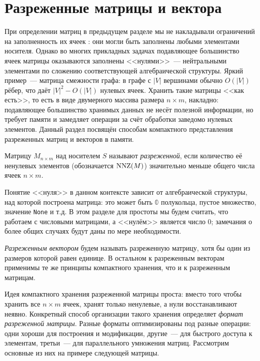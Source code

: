 \section{Разреженные матрицы и вектора}
\label{sec:SparseMatricesAndVectors}

При определении матриц в предыдущем разделе мы не накладывали ограничений на заполненность их ячеек
: они могли быть заполнены любыми элементами носителя.
Однако во многих прикладных задачах подавляющее большинство ячеек матрицы оказываются заполнены <<нулями>>~--- нейтральными элементами по сложению соответствующей алгебраической структуры.
Яркий пример~--- матрица смежности графа: в графе с $|V|$ вершинами обычно $O(|V|)$ рёбер, что даёт $|V|^2 - O(|V|)$ нулевых ячеек.
Хранить такие матрицы <<как есть>>, то есть в виде двумерного массива размера $n \times m$, накладно: подавляющее большинство хранимых данных не несёт полезной информации, но требует памяти и замедляет операции за счёт обработки заведомо нулевых элементов.
Данный раздел посвящён способам компактного представления разреженных матриц и векторов в памяти.

\begin{definition}
    \label{def:SparseMatrix}
    Матрицу $M_{n \times m}$ над носителем $S$ называют \emph{разреженной}, если количество её ненулевых элементов (обозначается $\operatorname{NNZ}(M)$) значительно меньше общего числа ячеек $n \times m$.
\end{definition}

Понятие <<нуля>> в данном контексте зависит от алгебраической структуры, над которой построена матрица: это может быть $\Bbbzero$ полукольца, пустое множество, значение \texttt{None} и т.д.
В этом разделе для простоты мы будем считать, что работаем с числовыми матрицами, а <<нулём>> является число $0$; замечания о более общих случаях будут даны по мере необходимости.

\begin{definition}
    \label{def:SparseVector}
    \emph{Разреженным вектором} будем называть разреженную матрицу, хотя бы один из размеров которой равен единице.
    В остальном к разреженным векторам применимы те же принципы компактного хранения, что и к разреженным матрицам.
\end{definition}

Идея компактного хранения разреженной матрицы проста: вместо того чтобы хранить все $n \times m$ ячеек, хранят только ненулевые, а нули восстанавливают неявно.
Конкретный способ организации такого хранения определяет \emph{формат разреженной матрицы}.
Разные форматы оптимизированы под разные операции: одни хороши для построения и модификации, другие~--- для быстрого доступа к элементам, третьи~--- для параллельного умножения матриц.
Рассмотрим основные из них на примере следующей матрицы.

